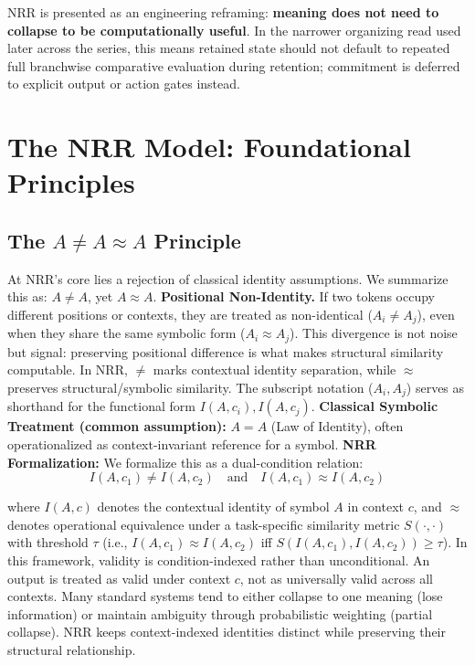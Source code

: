\documentclass[11pt,a4paper]{article}
\newcommand{\AneqAapproxA}{A \neq A \approx A}
\begin{document}
NRR is presented as an engineering reframing: \textbf{meaning does not need to collapse to be computationally useful}. In the narrower organizing read used later across the series, this means retained state should not default to repeated full branchwise comparative evaluation during retention; commitment is deferred to explicit output or action gates instead.

\section{The NRR Model: Foundational Principles}

\subsection{The $\AneqAapproxA$ Principle}

At NRR's core lies a rejection of classical identity assumptions.
We summarize this as: $A \neq A$, yet $A \approx A$.
\textbf{Positional Non-Identity.}
If two tokens occupy different positions or contexts, they are treated as non-identical
($A_i \neq A_j$), even when they share the same symbolic form ($A_i \approx A_j$).
This divergence is not noise but signal: preserving positional difference is what makes structural similarity computable.
In NRR, $\neq$ marks contextual identity separation, while $\approx$ preserves structural/symbolic similarity.
The subscript notation ($A_i, A_j$) serves as shorthand for the functional form $I(A, c_i), I(A, c_j)$.
\textbf{Classical Symbolic Treatment (common assumption):} $A = A$ (Law of Identity), often operationalized as context-invariant reference for a symbol.
\textbf{NRR Formalization:}
We formalize this as a dual-condition relation:
\begin{equation}
I(A, c_1) \neq I(A, c_2) \quad \text{and} \quad I(A, c_1) \approx I(A, c_2)
\end{equation}

where $I(A, c)$ denotes the contextual identity of symbol $A$ in context $c$, and $\approx$ denotes operational equivalence under a task-specific similarity metric $S(\cdot,\cdot)$ with threshold $\tau$ (i.e., $I(A, c_1) \approx I(A, c_2)$ iff $S(I(A, c_1), I(A, c_2)) \ge \tau$).
In this framework, validity is condition-indexed rather than unconditional.
An output is treated as valid under context $c$, not as universally valid across all contexts.
Many standard systems tend to either collapse to one meaning (lose information) or maintain ambiguity through probabilistic weighting (partial collapse).
NRR keeps context-indexed identities distinct while preserving their structural relationship.
\end{document}
